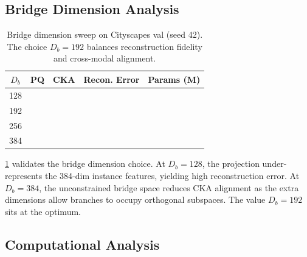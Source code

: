 \documentclass[10pt,twocolumn,letterpaper]{article}
\begin{document}
\subsection{Bridge Dimension Analysis}

\begin{table}[t]
\centering
\caption{Bridge dimension sweep on Cityscapes val (seed 42). The choice $D_b{=}192$ balances reconstruction fidelity and cross-modal alignment.}
\label{tab:bridge_sweep}
\setlength{\tabcolsep}{4pt}
\begin{tabular}{ccccc}
\toprule
$D_b$ & PQ & CKA & Recon. Error & Params (M) \\
\midrule
128 & \underline{\hspace{1.5em}} & \underline{\hspace{1.5em}} & \underline{\hspace{1.5em}} & \underline{\hspace{1.5em}} \\
192 & \underline{\hspace{1.5em}} & \underline{\hspace{1.5em}} & \underline{\hspace{1.5em}} & \underline{\hspace{1.5em}} \\
256 & \underline{\hspace{1.5em}} & \underline{\hspace{1.5em}} & \underline{\hspace{1.5em}} & \underline{\hspace{1.5em}} \\
384 & \underline{\hspace{1.5em}} & \underline{\hspace{1.5em}} & \underline{\hspace{1.5em}} & \underline{\hspace{1.5em}} \\
\bottomrule
\end{tabular}
\end{table}

\cref{tab:bridge_sweep} validates the bridge dimension choice. At $D_b{=}128$, the projection under-represents the 384-dim instance features, yielding high reconstruction error. At $D_b{=}384$, the unconstrained bridge space reduces CKA alignment as the extra dimensions allow branches to occupy orthogonal subspaces. The value $D_b{=}192$ sits at the optimum.


\subsection{Computational Analysis}
\end{document}
